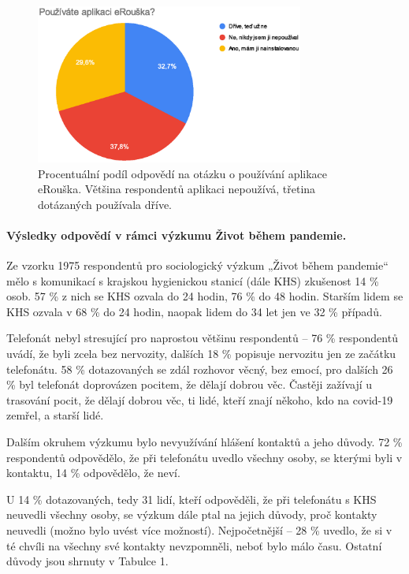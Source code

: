 \begin{figure}
\begin{center}
    \includegraphics[width=250pt]{./pic/graf3.eps}
 \end{center}    
\caption{Procentuální podíl odpovědí na otázku o používání aplikace eRouška. Většina respondentů aplikaci nepoužívá, třetina dotázaných používala dříve.}
 \end{figure}
 
\paragraph* {Výsledky odpovědí v rámci výzkumu Život během pandemie.}
Ze vzorku 1975 respondentů pro sociologický výzkum „Život během pandemie“ mělo s komunikací s krajskou hygienickou stanicí (dále KHS) zkušenost 14 \% osob. 57 \% z nich se KHS ozvala do 24 hodin, 76 \% do 48 hodin. Starším lidem se KHS ozvala v 68 \% do 24 hodin, naopak lidem do 34 let jen ve 32 \% případů. 

Telefonát nebyl stresující pro naprostou většinu respondentů -- 76 \% respondentů uvádí, že byli zcela bez nervozity, dalších 18 \% popisuje nervozitu jen ze začátku telefonátu. 58 \% dotazovaných se zdál rozhovor věcný, bez emocí, pro dalších 26 \% byl telefonát doprovázen pocitem, že dělají dobrou věc. Častěji zažívají u trasování pocit, že dělají dobrou věc, ti lidé, kteří znají někoho, kdo na covid-19 zemřel, a starší lidé.

Dalším okruhem výzkumu bylo nevyužívání hlášení kontaktů a jeho důvody. 72 \% respondentů odpovědělo, že při telefonátu uvedlo všechny osoby, se kterými byli v kontaktu, 14 \% odpovědělo, že neví. 

U 14 \% dotazovaných, tedy 31 lidí, kteří odpověděli, že při telefonátu s KHS neuvedli všechny osoby, se výzkum dále ptal na jejich důvody, proč kontakty neuvedli (možno bylo uvést více možností). Nejpočetnější -- 28 \% uvedlo, že si v té chvíli na všechny své kontakty nevzpomněli, neboť bylo málo času. Ostatní důvody jsou shrnuty v Tabulce 1.

